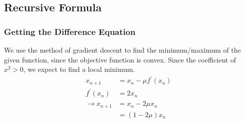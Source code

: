 \documentclass{beamer}
\providecommand{\brak}[1]{\ensuremath{\left(#1\right)}}
\theoremstyle{remark}
\providecommand{\norm}[1]{\lVert#1\rVert}
\newcommand{\myvec}[1]{\ensuremath{\begin{pmatrix}#1\end{pmatrix}}}
\let\vec\mathbf
\numberwithin{equation}{section}
\begin{document}
\subsection{Recursive Formula}
\begin{frame}
    \frametitle{Getting the Difference Equation}
We use the method of gradient descent to find the minimum/maximum of the given function, since the objective function is convex.
Since the coefficient of $x^2 > 0$, we expect to find a local minimum.
\begin{align}
    x_{n+1} &= x_n - \mu f^{\prime}\brak{x_n}\\
    f^{\prime}\brak{x_n} &= 2x_n\\
    \xrightarrow{} x_{n+1} &= x_n - 2\mu x_n \\
    &= \brak{1-2\mu}x_n
\end{align}
\end{frame}
\end{document}
